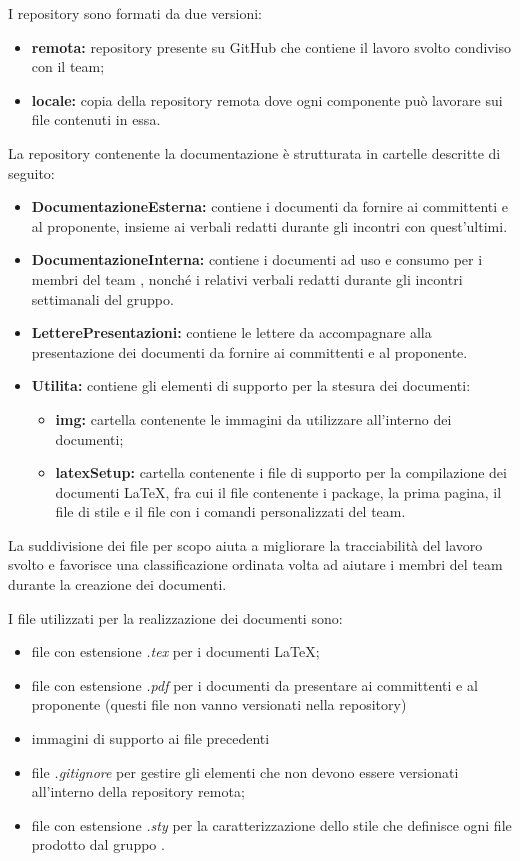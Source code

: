 I repository sono formati da due versioni:
\begin{itemize}
	\item \textbf{remota:} repository presente su GitHub che contiene il lavoro svolto condiviso con il team;
	\item \textbf{locale:} copia della repository remota dove ogni componente può lavorare sui file contenuti in essa.
\end{itemize}

La repository contenente la documentazione è strutturata in cartelle descritte di seguito:
\begin{itemize}
 \item \textbf{DocumentazioneEsterna:} contiene i documenti da fornire ai committenti e al proponente, insieme ai verbali redatti durante gli incontri con quest'ultimi.
\item \textbf{DocumentazioneInterna:} contiene i documenti ad uso e consumo per i membri del team \Omicron, nonché i relativi verbali redatti durante gli incontri settimanali del gruppo.
\item \textbf{LetterePresentazioni:} contiene le lettere da accompagnare alla presentazione dei documenti da fornire ai committenti e al proponente.
\item \textbf{Utilita:} contiene gli elementi di supporto per la stesura dei documenti:
\begin{itemize}
	\item \textbf{img:} cartella contenente le immagini da utilizzare all'interno dei documenti;
	\item \textbf{latexSetup: } cartella contenente i file di supporto per la compilazione dei documenti \LaTeX, fra cui il file contenente i package, la prima pagina, il file di stile e il file con i comandi personalizzati del team.
\end{itemize}
\end{itemize}
La suddivisione dei file per scopo aiuta a migliorare la tracciabilità del lavoro svolto e favorisce una classificazione ordinata volta ad aiutare i membri del team durante la creazione dei documenti.


I file utilizzati per la realizzazione dei documenti sono:
\begin{itemize}
	\item file con estensione \textit{.tex} per i documenti \LaTeX;
	\item file con estensione \textit{.pdf} per i documenti da presentare ai committenti e al proponente (questi file non vanno versionati nella repository)
	\item immagini di supporto ai file precedenti
	\item file \textit{.gitignore} per gestire gli elementi che non devono essere versionati all'interno della repository remota;
	\item file con estensione \textit{.sty} per la caratterizzazione dello stile che definisce ogni file prodotto dal gruppo \Omicron.
\end{itemize}

